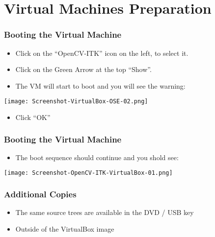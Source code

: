 \section{Virtual Machines Preparation}


\begin{frame}
\frametitle{Booting the Virtual Machine}
\begin{itemize}
\item Click on the ``OpenCV-ITK'' icon on the left, to select it.
\item Click on the Green Arrow at the top ``Show''.
\item The VM will start to boot and you will see the warning:
\end{itemize}
\begin{center}
  \texttt{[image: Screenshot-VirtualBox-OSE-02.png]}
\end{center}
\begin{itemize}
\item Click ``OK''
\end{itemize}
\end{frame}

\begin{frame}
\frametitle{Booting the Virtual Machine}
\begin{itemize}
\item The boot sequence should continue and you shold see:
\end{itemize}
\begin{center}
  \texttt{[image: Screenshot-OpenCV-ITK-VirtualBox-01.png]}
\end{center}
\end{frame}


\begin{frame}
\frametitle{Additional Copies}
\begin{itemize}
\item The same source trees are available in the DVD / USB key
\item Outside of the VirtualBox image
\end{itemize}
\end{frame}

